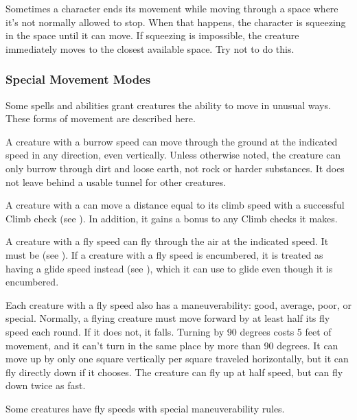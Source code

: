              Sometimes a character ends its movement while moving through a space where it's not normally allowed to stop. When that happens, the character is squeezing in the space until it can move. If squeezing is impossible, the creature immediately moves to the closest available space. Try not to do this.

        \subsubsection{Special Movement Modes}\label{Special Movement Modes}
            Some spells and abilities grant creatures the ability to move in unusual ways. These forms of movement are described here.

            A creature with a burrow speed can move through the ground at the indicated speed in any direction, even vertically. Unless otherwise noted, the creature can only burrow through dirt and loose earth, not rock or harder substances. It does not leave behind a usable tunnel for other creatures.

            A creature with a  can move a distance equal to its climb speed with a successful Climb check (see ).
            In addition, it gains a  bonus to any Climb checks it makes.

            \label{Flying}
            A creature with a fly speed can fly through the air at the indicated speed. It must be  (see ). If a creature with a fly speed is encumbered, it is treated as having a glide speed instead (see ), which it can use to glide even though it is encumbered.

            Each creature with a fly speed also has a maneuverability: good, average, poor, or special. Normally, a flying creature must move forward by at least half its fly speed each round. If it does not, it falls. Turning by 90 degrees costs 5 feet of movement, and it can't turn in the same place by more than 90 degrees. It can move up by only one square vertically per square traveled horizontally, but it can fly directly down if it chooses. The creature can fly up at half speed, but can fly down twice as fast.

            \label{Maneuverability} Some creatures have fly speeds with special maneuverability rules.

